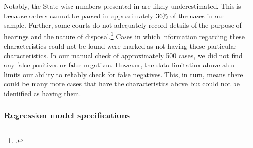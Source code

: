 Notably, the State-wise numbers presented in  are likely underestimated. This is because orders cannot be parsed in approximately 36\% of the cases in our sample. Further, some courts do not adequately record details of the purpose of hearings and the nature of disposal.\footcite{damle2020_ecourtsData} Cases in which information regarding these characteristics could not be found were marked as not having those particular characteristics. In our manual check of approximately 500 cases, we did not find any false positives or false negatives. However, the data limitation above also limits our ability to reliably check for false negatives. This, in turn, means there could be many more cases that have the characteristics above but could not be identified as having them.

\subsubsection{Regression model specifications} \label{sec:model-selection}


